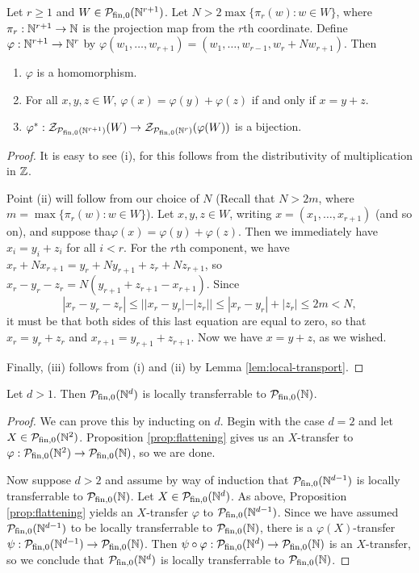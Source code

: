 \begin{prop}\label{prop:flattening}
Let $r \ge 1$ and $W\in \mathcal{P}_{\textrm{fin}, 0}(\mathbb{N}^{r+1})$.
Let $N > 2 \max\{\pi_r(w): w\in W\}$, where $\pi_r: \mathbb{N}^{r+1} \to \mathbb{N}$ is the projection map from the $r$th coordinate.
Define $\varphi: \mathbb{N}^{r+1} \to \mathbb{N}^r$ by $\varphi(w_1,\dots, w_{r+1}) = (w_1,\dots, w_{r-1},w_r + N w_{r+1})$.
Then
\begin{enumerate}[label={\rm (\roman{*})}]
	\item $\varphi$ is a homomorphism.
	\item For all $x,y,z\in W$, $\varphi(x) = \varphi(y) + \varphi(z)$ if and only if $x = y + z$.
	\item $\varphi^*:\mathcal{Z}_{\mathcal{P}_{\textrm{fin}, 0}(\mathbb{N}^{r+1})}(W) \to \mathcal{Z}_{\mathcal{P}_{\textrm{fin}, 0}(\mathbb{N}^r)}(\varphi(W))$ is a bijection.
\end{enumerate}
\end{prop}
\begin{proof}
It is easy to see (i), for this follows from the distributivity of multiplication in $\mathbb{Z}$.

Point (ii) will follow from our choice of $N$ (Recall that $N > 2m$, where $m = \max\{\pi_r(w): w\in W\}$).
Let $x,y,z\in W$, writing $x = (x_1,\dots, x_{r+1})$ (and so on), and suppose tha$\varphi(x) = \varphi(y) + \varphi(z)$.
Then we immediately have $x_i = y_i + z_i$ for all $i < r$.
For the $r$th component, we have $x_r + Nx_{r+1} = y_r + Ny_{r+1} + z_r + Nz_{r+1}$, so
$x_r -y_r - z_r = N(y_{r+1}+z_{r+1}-x_{r+1})$.
Since 
\[|x_r - y_r - z_r| \le | |x_r - y_r| - |z_r| | \le |x_r-y_r| + |z_r| \le 2m < N,\]
it must be that both sides of this last equation are equal to zero, so that $x_r = y_r + z_r$ and $x_{r+1} = y_{r+1}+z_{r+1}$.
Now we have $x = y+z$, as we wished.

Finally, (iii) follows from (i) and (ii) by Lemma \ref{lem:local-transport}.
\end{proof}

\begin{thm}\label{thm:passage-to-Nd}
Let $d > 1$. 
Then $\mathcal{P}_{\textrm{fin}, 0}(\mathbb{N}^d)$ is locally transferrable to ${\mathcal{P}_{\textrm{fin},0}(\mathbb{N})}$.
\end{thm}
\begin{proof}
We can prove this by inducting on $d$.
Begin with the case $d=2$ and let $X\in \mathcal{P}_{\textrm{fin}, 0}(\mathbb{N}^2)$.
Proposition \ref{prop:flattening} gives us an $X$-transfer to $\varphi:\mathcal{P}_{\textrm{fin}, 0}(\mathbb{N}^2) \to {\mathcal{P}_{\textrm{fin},0}(\mathbb{N})}$, so we are done.

Now suppose $d>2$ and assume by way of induction that $\mathcal{P}_{\textrm{fin}, 0}(\mathbb{N}^{d-1})$ is locally transferrable to ${\mathcal{P}_{\textrm{fin},0}(\mathbb{N})}$.
Let $X\in \mathcal{P}_{\textrm{fin}, 0}(\mathbb{N}^{d})$.
As above, Proposition \ref{prop:flattening} yields an $X$-transfer $\varphi$ to $\mathcal{P}_{\textrm{fin}, 0}(\mathbb{N}^{d-1})$.
Since we have assumed $\mathcal{P}_{\textrm{fin}, 0}(\mathbb{N}^{d-1})$ to be locally transferrable to ${\mathcal{P}_{\textrm{fin},0}(\mathbb{N})}$, there is a $\varphi(X)$-transfer $\psi: \mathcal{P}_{\textrm{fin}, 0}(\mathbb{N}^{d-1}) \to {\mathcal{P}_{\textrm{fin},0}(\mathbb{N})}$.
Then $\psi\circ\varphi: \mathcal{P}_{\textrm{fin}, 0}(\mathbb{N}^d) \to {\mathcal{P}_{\textrm{fin},0}(\mathbb{N})}$ is an $X$-transfer, so we conclude that $\mathcal{P}_{\textrm{fin}, 0}(\mathbb{N}^d)$ is locally transferrable to ${\mathcal{P}_{\textrm{fin},0}(\mathbb{N})}$.
\end{proof}

